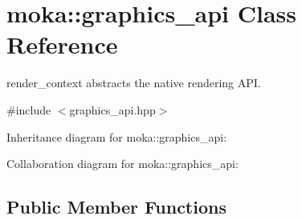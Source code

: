 \hypertarget{classmoka_1_1graphics__api}{}\section{moka\+::graphics\+\_\+api Class Reference}
\label{classmoka_1_1graphics__api}


render\+\_\+context abstracts the native rendering A\+PI.  




{\ttfamily \#include $<$graphics\+\_\+api.\+hpp$>$}



Inheritance diagram for moka\+::graphics\+\_\+api\+:


Collaboration diagram for moka\+::graphics\+\_\+api\+:
\subsection*{Public Member Functions}
